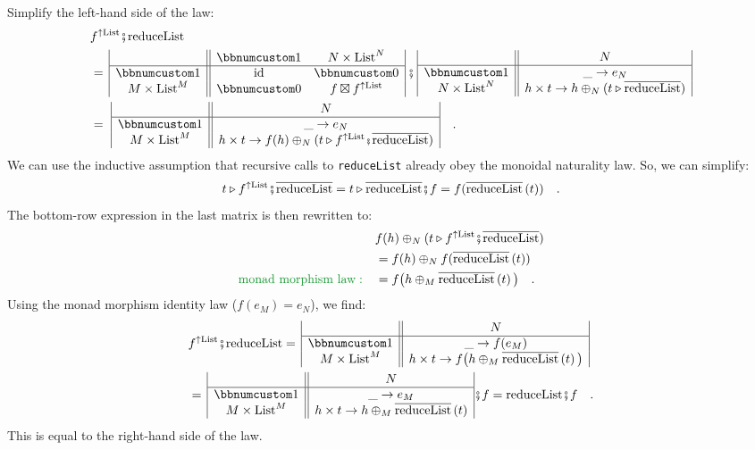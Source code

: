 Simplify the left-hand side of the law:
\begin{align*}
 & f^{\uparrow\text{List}}\bef\text{reduceList}\\
 & =\,\begin{array}{|c||cc|}
 & \bbnum 1 & N\times\text{List}^{N}\\
\hline \bbnum 1 & \text{id} & \bbnum 0\\
M\times\text{List}^{M} & \bbnum 0 & f\boxtimes f^{\uparrow\text{List}}
\end{array}\,\bef\,\begin{array}{|c||c|}
 & N\\
\hline \bbnum 1 & \_\rightarrow e_{N}\\
N\times\text{List}^{N} & h\times t\rightarrow h\oplus_{N}(t\triangleright\overline{\text{reduceList}})
\end{array}\\
 & =\,\,\begin{array}{|c||c|}
 & N\\
\hline \bbnum 1 & \_\rightarrow e_{N}\\
M\times\text{List}^{M} & h\times t\rightarrow f(h)\oplus_{N}(t\triangleright f^{\uparrow\text{List}}\bef\overline{\text{reduceList}})
\end{array}\quad.
\end{align*}
We can use the inductive assumption that recursive calls to \lstinline!reduceList!
already obey the monoidal naturality law. So, we can simplify:
\[
t\triangleright f^{\uparrow\text{List}}\bef\overline{\text{reduceList}}=t\triangleright\overline{\text{reduceList}}\bef f=f(\overline{\text{reduceList}}\left(t\right))\quad.
\]
The bottom-row expression in the last matrix is then rewritten to:
\begin{align*}
 & f(h)\oplus_{N}(t\triangleright f^{\uparrow\text{List}}\bef\overline{\text{reduceList}})\\
 & =f(h)\oplus_{N}f(\overline{\text{reduceList}}\left(t\right))\\
{\color{greenunder}\text{monad morphism law}:}\quad & =f\big(h\oplus_{M}\overline{\text{reduceList}}\left(t\right)\big)\quad.
\end{align*}
Using the monad morphism identity law ($f(e_{M})=e_{N}$), we find:
\begin{align*}
 & f^{\uparrow\text{List}}\bef\text{reduceList}=\,\begin{array}{|c||c|}
 & N\\
\hline \bbnum 1 & \_\rightarrow f(e_{M})\\
M\times\text{List}^{M} & h\times t\rightarrow f\big(h\oplus_{M}\overline{\text{reduceList}}\left(t\right)\big)
\end{array}\\
 & =\,\begin{array}{|c||c|}
 & N\\
\hline \bbnum 1 & \_\rightarrow e_{M}\\
M\times\text{List}^{M} & h\times t\rightarrow h\oplus_{M}\overline{\text{reduceList}}\left(t\right)
\end{array}\bef f=\text{reduceList}\bef f\quad.
\end{align*}
 This is equal to the right-hand side of the law.


